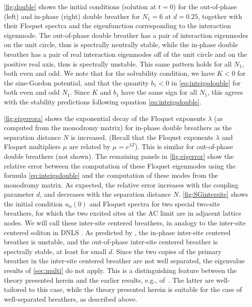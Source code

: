 \documentclass[12pt,reqno]{amsart}
\theoremstyle{definition}
\begin{document}
\cref{fig:double} shows the initial conditions (solution at $t=0$) for the out-of-phase (left) and in-phase (right) double breather for $N_1 = 6$ at $d = 0.25$, together with their Floquet spectra and the eigenfunction corresponding to the interaction eigenmode. The out-of-phase double breather has a pair of interaction eigenmodes on the unit circle, thus is spectrally neutrally stable, while the in-phase double breather has a pair of real interaction eigenmodes off of the unit circle and on the positive real axis, thus is spectrally unstable. This same pattern holds for all $N_1$, both even and odd. We note that for the solvability condition, we have $K < 0$ for the sine-Gordon potential, and that the quantity $b_1 < 0$ in \cref{eq:inteigsdouble} for both even and odd $N_1$. Since $K$ and $b_1$ have the same sign for all $N_1$, this agrees with the stability predictions following equation \cref{eq:inteigsdouble}.

\cref{fig:eigerrora} shows the exponential decay of the Floquet exponents $\lambda$ (as computed from the monodromy matrix) for in-phase double breathers as the separation distance $N$ is increased. (Recall that the Floquet exponents $\lambda$ and Floquet multipliers $\mu$ are related by $\mu = e^{\lambda T}$).
This is similar for out-of-phase double breathers (not shown). The remaining panels in \cref{fig:eigerror} show the relative error between the computation of these Floquet eigenmodes using the formula \cref{eq:inteigsdouble} and the computation of these modes from the monodromy matrix. As expected, the relative error increases with the coupling parameter $d$, and decreases with the separation distance $N$. \cref{fig:SGintersite} shows the initial condition $u_n(0)$ and Floquet spectra for two special two-site breathers, for which the two excited sites at the AC limit are in adjacent lattice nodes. We will call these inter-site centered breathers, in analogy to the inter-site centered soliton in DNLS \cite{Kevrekidis2009}.
As predicted by \cite{cuevas-maraver2016}, the in-phase inter-site centered breather is unstable, and the out-of-phase inter-site centered breather is spectrally stable, at least for small $d$. Since the two copies of the primary breather in the inter-site centered breather are not well separated, the eigenvalue results of \cref{sec:multi} do not apply. This is a
distinguishing feature between the theory presented herein
and the earlier results, e.g., of~\cites{Archilla2003,Koukouloyannis2009}. The latter are
well-tailored to this case, while the theory presented herein
is suitable for the case of well-separated breathers, as 
described above.
\end{document}
